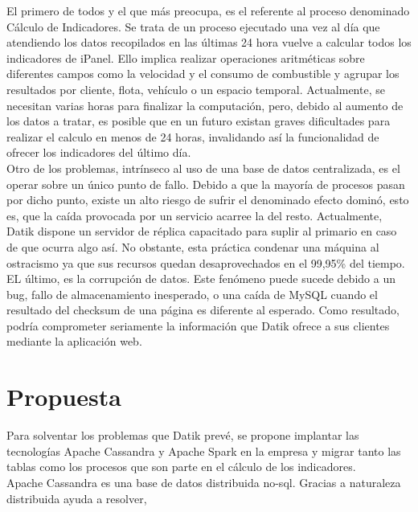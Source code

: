 El primero de todos y el que más preocupa, es el referente al proceso denominado Cálculo de Indicadores. Se trata de un proceso ejecutado una vez al día que atendiendo los datos recopilados en las últimas 24 hora vuelve a calcular todos los indicadores de iPanel. Ello implica realizar operaciones aritméticas sobre diferentes campos como la velocidad y el consumo de combustible y agrupar los resultados por cliente, flota, vehículo o un espacio temporal. Actualmente, se necesitan varias horas para finalizar la computación, pero, debido al aumento de los datos a tratar, es posible que en un futuro existan graves dificultades para realizar el calculo en menos de 24 horas, invalidando así la funcionalidad de ofrecer los indicadores del último día.\\

Otro de los problemas, intrínseco al uso de una base de datos centralizada, es el operar sobre un único punto de fallo. Debido a que la mayoría de procesos pasan por dicho punto, existe un alto riesgo de sufrir el denominado efecto dominó, esto es, que la caída provocada por un servicio acarree la del resto. Actualmente, Datik dispone un servidor de réplica capacitado para suplir al primario en caso de que ocurra algo así. No obstante, esta práctica condenar una máquina al ostracismo ya que sus recursos quedan desaprovechados en el 99,95\% del tiempo.\\

EL último, es la corrupción de datos. Este fenómeno puede sucede debido a un bug, fallo de almacenamiento inesperado, o una caída de MySQL cuando el resultado del checksum de una página es diferente al esperado. Como resultado, podría comprometer seriamente la información que Datik ofrece a sus clientes mediante la aplicación web.\\

\section{Propuesta}

Para solventar los problemas que Datik prevé, se propone implantar las tecnologías Apache Cassandra y Apache Spark en la empresa y migrar tanto las tablas como los procesos que son parte en el cálculo de los indicadores.\\


Apache Cassandra es una base de datos distribuida no-sql. Gracias a naturaleza distribuida ayuda a resolver, 






